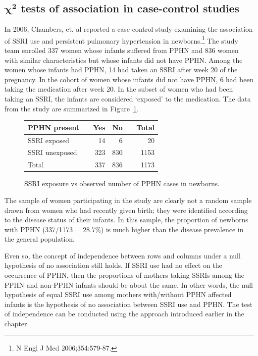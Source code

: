 \textD{\newpage}


\subsection{$\pmb{\chi^2}$ tests of association in case-control studies}
\label{caseControlTests}


In 2006, Chambers, et. al reported a case-control study examining the association of SSRI use and persistent pulmonary hypertension in newborns.\footnote{N Engl J Med 2006;354:579-87.}  The study team enrolled 337 women whose infants suffered from PPHN and 836 women with similar characteristics but whose infants did not have PPHN.  Among the women whose infants had PPHN, 14 had taken an SSRI after week 20 of the pregnancy.  In the cohort of women whose infants did not have PPHN, 6 had been taking the medication after week 20. In the subset of women who had been taking an SSRI, the infants are considered `exposed' to the medication. The data from the study are summarized in Figure~\ref{ssriPPHNObserved}.

\begin{figure}[h]
	\centering
	\begin{tabular}{ll rrr r}
		\hline
		PPHN present	 & \hspace{2mm} & Yes & No & \hspace{2mm} & Total \\
		\hline
		SSRI exposed &	& 14 & 6 &  & 20  \\
		SSRI unexposed & & 323 & 830 &  & 1153  \\
        Total & & 337 & 836 & & 1173 \\
		\hline
	\end{tabular}
	\caption{SSRI exposure vs observed number of PPHN cases in newborns.}
    \label{ssriPPHNObserved}
\end{figure}	

The sample of women participating in the study are clearly not a random sample drawn from women who had recently given birth; they were identified according to the disease status of their infants.  In this sample, the proportion of newborns with PPHN (337/1173 = 28.7\%) is much higher than the disease prevalence in the general population.  

Even so, the concept of independence between rows and columns under a null hypothesis of no association still holds. If SSRI use had no effect on the occurrence of PPHN, then the proportions of mothers taking SSRIs among the PPHN and non-PPHN infants should be about the same. In other words, the null hypothesis of equal SSRI use among mothers with/without PPHN affected infants is the hypothesis of no association between SSRI use and PPHN. The test of independence can be conducted using the approach introduced earlier in the chapter.

